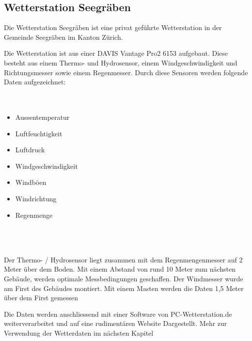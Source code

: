 \begin{refsection}
\section{Wetterstation Seegräben}

Die Wetterstation Seegräben ist eine privat geführte Wetterstation in der Gemeinde Seegräben im Kanton Zürich.

Die Wetterstation ist aus einer DAVIS Vantage Pro2 6153 aufgebaut.
Diese besteht aus einem Thermo- und  Hydrosensor, einem Windgeschwindigkeit und Richtungsmesser sowie einem Regenmesser. 
Durch diese Sensoren werden folgende Daten aufgezeichnet:
\\
\\
\\

\begin{minipage}{0.5\textwidth}
\begin{itemize}
	\item Aussentemperatur
	\item Luftfeuchtigkeit
	\item Luftdruck
	\item Windgeschwindigkeit

\end{itemize}	
\end{minipage}
\begin{minipage}{0.5\textwidth}
\begin{itemize}
	\item Windböen
	\item Windrichtung
	\item Regenmenge
	\\
	\\
\end{itemize}	
\end{minipage}
\\
\\

Der Thermo- / Hydrosensor liegt zusammen mit dem Regenmengenmesser auf 2 Meter über dem Boden. Mit einem Abstand von rund 10 Meter zum nächsten Gebäude, werden optimale Messbedingungen geschaffen. Der Windmesser wurde am First des Gebäudes montiert. Mit einem Masten werden die Daten 1,5 Meter über dem First gemessen 

Die Daten werden anschliessend mit einer Software von PC-Wetterstation.de weiterverarbeitet und auf eine rudiment\"aren Website Dargestellt. Mehr zur Verwendung der Wetterdaten im n\"achsten Kapitel





\end{refsection}
